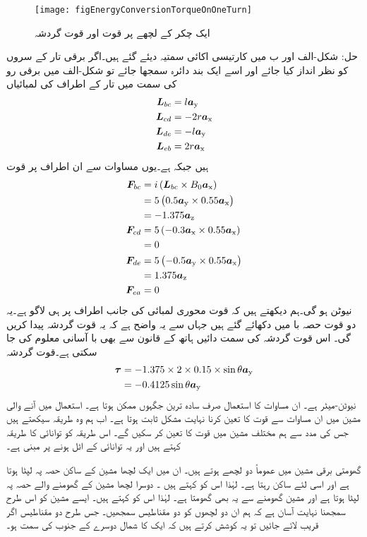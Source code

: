 %
\begin{figure}
\centering
\texttt{[image: figEnergyConversionTorqueOnOneTurn]}
\caption{ایک چکر کے لچھے پر قوت اور قوت گردشہ}
\label{شکل_تبادلہ_طاقت_لچھے_پر_قوت_اور_مروڑ}
\end{figure}
%
حل:
	شکل-الف اور ب میں کارتیسی اکائی سمتیہ دیئے گئے ہیں۔اگر برقی تار کے سروں کو نظر انداز کیا جائے اور اسے ایک بند دائرہ سمجھا جائے تو  شکل-الف میں  برقی رو کی سمت میں تار کے اطراف کی لمبائیاں 
\begin{align*}
{\ensuremath{{\boldsymbol{L}}}}_{bc}&=l {\boldsymbol{a}}_{\textup{y}}\\
{{\boldsymbol{L}}}_{cd}&=-2 r {\boldsymbol{a}}_{\textup{x}}\\
{{\boldsymbol{L}}}_{de}&=-l {\boldsymbol{a}}_{\textup{y}}\\
{{\boldsymbol{L}}}_{eb}&=2 r {\boldsymbol{a}}_{\textup{x}}
\end{align*}
ہیں جبکہ  ہے۔یوں مساوات   سے ان اطراف پر قوت
\begin{align*}
{\ensuremath{{\boldsymbol{F}}}}_{bc}&= i \left({{\boldsymbol{L}}}_{bc} \times B_0 {\boldsymbol{a}}_{\textup{x}} \right)\\
&=5 \left(0.5 {\boldsymbol{a}}_{\textup{y}} \times 0.55 {\boldsymbol{a}}_{\textup{x}} \right)\\
&=-1.375 {\boldsymbol{a}}_{\textup{z}}\\
{{\boldsymbol{F}}}_{cd}&= 5\left(-0.3{\boldsymbol{a}}_{\textup{x}} \times 0.55 {\boldsymbol{a}}_{\textup{x}} \right)\\
&=0\\
{{\boldsymbol{F}}}_{de}&= 5 \left(-0.5{\boldsymbol{a}}_{\textup{y}} \times 0.55 {\boldsymbol{a}}_{\textup{x}} \right)\\
&=1.375 {\boldsymbol{a}}_{\textup{z}}\\
{{\boldsymbol{F}}}_{ea}&= 0
\end{align*}
نیوٹن ہو گی۔ہم دیکھتے ہیں کہ قوت محوری لمبائی کی جانب اطراف پر ہی لاگو  ہے۔یہ دو قوت حصہ با میں دکھائے گئے ہیں جہاں سے یہ واضح ہے کہ یہ قوت گردشہ پیدا کریں گی۔ اس قوت گردشہ کی سمت دائیں ہاتھ کے قانون سے بھی با آسانی معلوم کی جا سکتی ہے۔قوت گردشہ
\begin{align*}
{\ensuremath{{\boldsymbol{\tau}}}}&=-1.375 \times 2 \times 0.15 \times \sin \theta {\boldsymbol{a}}_{\textup{y}}\\
&=-0.4125 \sin \theta {\boldsymbol{a}}_{\textup{y}}
\end{align*}
نیوٹن-میٹر ہے۔
%
	 ان مساوات کا استعمال صرف سادہ ترین جگہوں ممکن ہوتا ہے۔ استعمال میں آنے والی مشین میں ان مساوات سے قوت کا تعین کرنا نہایت مشکل ثابت ہوتا ہے۔ اب ہم وہ طریقہ سیکھتے ہیں جس کی مدد سے ہم مختلف مشین میں قوت کا تعین کر سکیں گے۔ اس طریقہ کو توانائی کا طریقہ کہتے ہیں اور یہ توانائی کے اٹل ہونے پر مبنی ہے۔

گھومتی برقی مشین میں عموماً دو لچھے ہوتے ہیں۔ ان میں ایک لچھا  مشین کے ساکن حصہ پہ لپٹا ہوتا ہے اور اسی لئے ساکن رہتا ہے۔ لہٰذا  اس کو    کہتے ہیں ۔  دوسرا لچھا  مشین کے گھومنے والے حصہ پہ لپٹا ہوتا ہے اور مشین گھومنے سے یہ بھی گھومتا ہے۔ لہٰذا اس کو   کہتے ہیں۔  ایسے مشین  کو اس طرح سمجھنا نہایت آسان ہے کہ ہم ان دو لچھوں کو دو مقناطیس سمجھیں۔ جس طرح دو مقناطیس اگر قریب لائے جائیں تو یہ کوشش کرتے ہیں کہ ایک کا شمال  دوسرے کے جنوب  کی سمت  ہو۔

